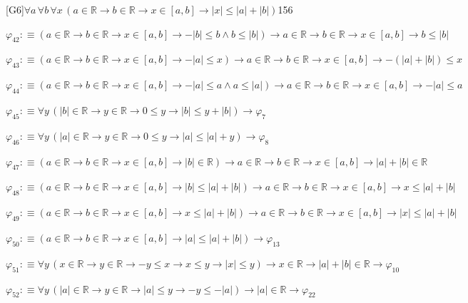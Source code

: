 \begin{fullproof}{[G6]}{$\forall a\,\forall b\,\forall x\,(a \in \mathbb{R} \to b \in \mathbb{R} \to x \in [a,b] \to \lvert x \rvert \leq \lvert a \rvert + \lvert b \rvert)$}{156}
\begin{abbrevlist}
\item $\varphi_{42} :\equiv (a \in \mathbb{R} \to b \in \mathbb{R} \to x \in [a,b] \to -\lvert b \rvert \leq b \land b \leq \lvert b \rvert) \to a \in \mathbb{R} \to b \in \mathbb{R} \to x \in [a,b] \to b \leq \lvert b \rvert$
\item $\varphi_{43} :\equiv (a \in \mathbb{R} \to b \in \mathbb{R} \to x \in [a,b] \to -\lvert a \rvert \leq x) \to a \in \mathbb{R} \to b \in \mathbb{R} \to x \in [a,b] \to -(\lvert a \rvert + \lvert b \rvert) \leq x$
\item $\varphi_{44} :\equiv (a \in \mathbb{R} \to b \in \mathbb{R} \to x \in [a,b] \to -\lvert a \rvert \leq a \land a \leq \lvert a \rvert) \to a \in \mathbb{R} \to b \in \mathbb{R} \to x \in [a,b] \to -\lvert a \rvert \leq a$
\item $\varphi_{45} :\equiv \forall y\,(\lvert b \rvert \in \mathbb{R} \to y \in \mathbb{R} \to 0 \leq y \to \lvert b \rvert \leq y + \lvert b \rvert) \to \varphi_{7}$
\item $\varphi_{46} :\equiv \forall y\,(\lvert a \rvert \in \mathbb{R} \to y \in \mathbb{R} \to 0 \leq y \to \lvert a \rvert \leq \lvert a \rvert + y) \to \varphi_{8}$
\item $\varphi_{47} :\equiv (a \in \mathbb{R} \to b \in \mathbb{R} \to x \in [a,b] \to \lvert b \rvert \in \mathbb{R}) \to a \in \mathbb{R} \to b \in \mathbb{R} \to x \in [a,b] \to \lvert a \rvert + \lvert b \rvert \in \mathbb{R}$
\item $\varphi_{48} :\equiv (a \in \mathbb{R} \to b \in \mathbb{R} \to x \in [a,b] \to \lvert b \rvert \leq \lvert a \rvert + \lvert b \rvert) \to a \in \mathbb{R} \to b \in \mathbb{R} \to x \in [a,b] \to x \leq \lvert a \rvert + \lvert b \rvert$
\item $\varphi_{49} :\equiv (a \in \mathbb{R} \to b \in \mathbb{R} \to x \in [a,b] \to x \leq \lvert a \rvert + \lvert b \rvert) \to a \in \mathbb{R} \to b \in \mathbb{R} \to x \in [a,b] \to \lvert x \rvert \leq \lvert a \rvert + \lvert b \rvert$
\item $\varphi_{50} :\equiv (a \in \mathbb{R} \to b \in \mathbb{R} \to x \in [a,b] \to \lvert a \rvert \leq \lvert a \rvert + \lvert b \rvert) \to \varphi_{13}$
\item $\varphi_{51} :\equiv \forall y\,(x \in \mathbb{R} \to y \in \mathbb{R} \to -y \leq x \to x \leq y \to \lvert x \rvert \leq y) \to x \in \mathbb{R} \to \lvert a \rvert + \lvert b \rvert \in \mathbb{R} \to \varphi_{10}$
\item $\varphi_{52} :\equiv \forall y\,(\lvert a \rvert \in \mathbb{R} \to y \in \mathbb{R} \to \lvert a \rvert \leq y \to -y \leq -\lvert a \rvert) \to \lvert a \rvert \in \mathbb{R} \to \varphi_{22}$

\end{abbrevlist}
\end{fullproof}
